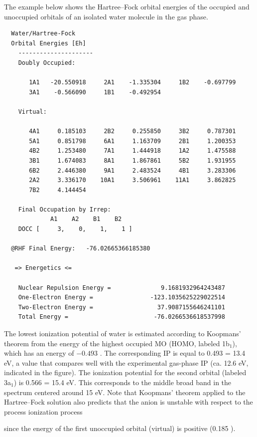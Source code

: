 \documentclass[../Main/chem371-notes.tex]{subfiles}
\begin{document}
The example below shows the Hartree--Fock orbital energies of the occupied and unoccupied orbitals of an isolated water molecule in the gas phase.
\begin{small}
\begin{verbatim}
  Water/Hartree-Fock
  Orbital Energies [Eh]
    ---------------------
    Doubly Occupied:                                                      

       1A1   -20.550918     2A1    -1.335304     1B2    -0.697799  
       3A1    -0.566090     1B1    -0.492954  

    Virtual:                                                              

       4A1     0.185103     2B2     0.255850     3B2     0.787301  
       5A1     0.851798     6A1     1.163709     2B1     1.200353  
       4B2     1.253480     7A1     1.444918     1A2     1.475588  
       3B1     1.674083     8A1     1.867861     5B2     1.931955  
       6B2     2.446380     9A1     2.483524     4B1     3.283306  
       2A2     3.336170    10A1     3.506961    11A1     3.862825  
       7B2     4.144454  

    Final Occupation by Irrep:
             A1    A2    B1    B2 
    DOCC [     3,    0,    1,    1 ]

  @RHF Final Energy:   -76.02665366185380

   => Energetics <=

    Nuclear Repulsion Energy =              9.1681932964243487
    One-Electron Energy =                -123.1035625229022514
    Two-Electron Energy =                  37.9087155646241101
    Total Energy =                        -76.0266536618537998
\end{verbatim}
\end{small}

The lowest ionization potential of water is estimated according to Koopmans' theorem from the energy of the highest occupied MO (HOMO, labeled 1b$_1$), which has an energy of $-0.493$ \Eh.
The corresponding IP is equal to 0.493 \Eh = 13.4 eV, a value that compares well with the experimental gas-phase IP (ca. 12.6 eV, indicated in the figure).
The ionization potential for the second orbital (labeled 3a$_1$) is 0.566 \Eh = 15.4 eV.
This corresponds to the  middle broad band in the spectrum centered around 15 eV.
Note that Koopmans' theorem applied to the Hartree--Fock solution also predicts that the anion  is unstable with respect to the process ionization process
\begin{center}
\end{center}
since the energy of the first unoccupied orbital (virtual) is positive (0.185 \Eh).
\end{document}
